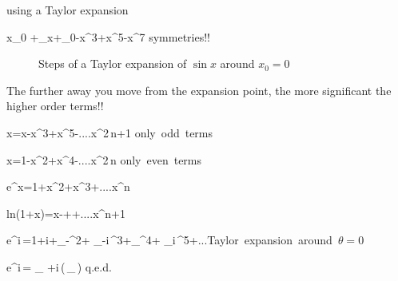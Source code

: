 using a Taylor expansion

\bnn
    \sin x\approx {}_{0}\; +\;_{x}\;+\;_{0}\;-\;\;x^{3}\;+\;\;x^{5}-\;\;x^{7} \qquad
    \mbox{symmetries!!}
\enn



\begin{figure}[!ht]

    \centerline{\epsfxsize=10cm  }

    \caption{Steps of a Taylor expansion of $\sin x$ around $x_0=0$}  \label{fig59}

\end{figure} \svs



The further away you move from the expansion point, the more significant the higher order terms!!






\bnn
\sin x=x-\;\;x^3\;+\;\;x^5-\;....\;\;x^{2\,n+1} \qquad \mbox{only odd terms}
\enn

\bnn
\cos x=1-\;\;x^2\;+\;\;x^4-\;....\;\;x^{2\,n} \qquad\qquad \mbox{only even terms}
\enn

\bnn e^{x}=1+\;\;x^2\;+\;\;x^3\;+\;....\;\;x^n \enn

\bnn  \mbox{ln}(1+x)=x-\;\;+\;\;+\;....\;\;x^{n+1}  \enn






\bnn e^{i\,\theta}=1+i\theta +_{-\theta^2}+ _{-i\,\theta^3}+_{\theta^4}+
_{i\,\theta^5}+...\qquad\mbox{Taylor expansion around $\theta=0$}
\enn

\bnn
  \Rightarrow \qquad e^{i\,\theta}= _{\cos\theta} \quad
    +i\,(\,_{\sin\theta}\,) \qquad\mbox{q.e.d.}
\enn



